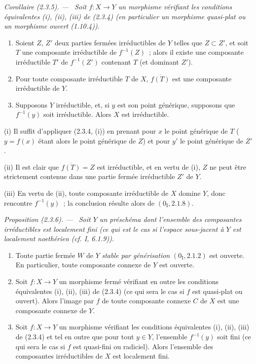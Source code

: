 \documentclass[10pt,oneside]{book}
\newenvironment{proposition}[1][]{%
  \par\medskip\noindent\itshape Proposition (#1). ---\ }{\par}
\newenvironment{corollary}[1][]{%
  \par\medskip\noindent\itshape Corollaire (#1). ---\ }{\par}
\begin{document}
\begin{corollary}[2.3.5]
\label{IV.2.3.5-fr}
Soit $f:X\to Y$ un morphisme vérifiant les conditions équivalentes (i), (ii),
(iii) de (2.3.4) (en particulier un morphisme quasi-plat ou un morphisme
ouvert (1.10.4)).
\begin{enumerate}
  \item[(i)] Soient $Z$, $Z'$ deux parties fermées irréductibles de $Y$ telles
  que $Z\subset Z'$, et soit $T$ une composante irréductible de $f^{-1}(Z)$~;
  alors il existe une composante irréductible $T'$ de $f^{-1}(Z')$ contenant
  $T$ (et dominant $Z'$).
  \item[(ii)] Pour toute composante irréductible $T$ de $X$,
  $\overline{f(T)}$ est une composante irréductible de $Y$.
  \item[(iii)] Supposons $Y$ irréductible, et, si $y$ est son point générique,
  supposons que $f^{-1}(y)$ soit irréductible. Alors $X$ est irréductible.
\end{enumerate}
\end{corollary}

(i) Il suffit d'appliquer (2.3.4, (i)) en prenant pour $x$ le point générique
de $T$ ($y=f(x)$ étant alors le point générique de $Z$) et pour $y'$ le point
générique de $Z'$.

(ii) Il est clair que $\overline{f(T)}=Z$ est irréductible, et en vertu de (i),
$Z$ ne peut être strictement contenue dans une partie fermée irréductible $Z'$
de $Y$.

(iii) En vertu de (ii), toute composante irréductible de $X$ domine $Y$, donc
rencontre $f^{-1}(y)$~; la conclusion résulte alors de
$(0_{\mathrm I},2.1.8)$.

\begin{proposition}[2.3.6]
\label{IV.2.3.6-fr}
Soit $Y$ un préschéma dont l'ensemble des composantes irréductibles est
\emph{localement fini} (ce qui est le cas si l'espace sous-jacent à $Y$ est
\emph{localement noethérien} (cf. I, 6.1.9)).
\begin{enumerate}
  \item[(i)] Toute partie fermée $W$ de $Y$ \emph{stable par générisation}
  $(0_{\mathrm I},2.1.2)$ est ouverte. En particulier, toute composante
  connexe de $Y$ est ouverte.
  \item[(ii)] Soit $f:X\to Y$ un morphisme fermé vérifiant en outre les
  conditions équivalentes (i), (ii), (iii) de (2.3.4) (ce qui sera le cas si
  $f$ est quasi-plat ou ouvert). Alors l'image par $f$ de toute composante
  connexe $C$ de $X$ est une composante connexe de $Y$.
  \item[(iii)] Soit $f:X\to Y$ un morphisme vérifiant les conditions
  équivalentes (i), (ii), (iii) de (2.3.4) et tel en outre que pour tout
  $y\in Y$, l'ensemble $f^{-1}(y)$ soit fini (ce qui sera le cas si $f$ est
  quasi-fini ou radiciel). Alors l'ensemble des composantes irréductibles de
  $X$ est localement fini.
\end{enumerate}
\end{proposition}
\end{document}
